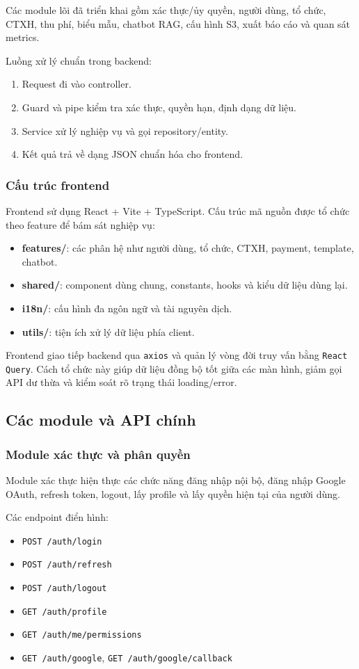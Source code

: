 Các module lõi đã triển khai gồm xác thực/ủy quyền, người dùng, tổ chức, CTXH, thu phí, biểu mẫu, chatbot RAG, cấu hình S3, xuất báo cáo và quan sát metrics.

Luồng xử lý chuẩn trong backend:
\begin{enumerate}
	\item Request đi vào controller.
	\item Guard và pipe kiểm tra xác thực, quyền hạn, định dạng dữ liệu.
	\item Service xử lý nghiệp vụ và gọi repository/entity.
	\item Kết quả trả về dạng JSON chuẩn hóa cho frontend.
\end{enumerate}

\subsubsection{Cấu trúc frontend}
Frontend sử dụng React + Vite + TypeScript. Cấu trúc mã nguồn được tổ chức theo feature để bám sát nghiệp vụ:
\begin{itemize}
	\item \textbf{features/}: các phân hệ như người dùng, tổ chức, CTXH, payment, template, chatbot.
	\item \textbf{shared/}: component dùng chung, constants, hooks và kiểu dữ liệu dùng lại.
	\item \textbf{i18n/}: cấu hình đa ngôn ngữ và tài nguyên dịch.
	\item \textbf{utils/}: tiện ích xử lý dữ liệu phía client.
\end{itemize}

Frontend giao tiếp backend qua \texttt{axios} và quản lý vòng đời truy vấn bằng \texttt{React Query}. Cách tổ chức này giúp dữ liệu đồng bộ tốt giữa các màn hình, giảm gọi API dư thừa và kiểm soát rõ trạng thái loading/error.

\subsection{Các module và API chính}

\subsubsection{Module xác thực và phân quyền}
Module xác thực hiện thực các chức năng đăng nhập nội bộ, đăng nhập Google OAuth, refresh token, logout, lấy profile và lấy quyền hiện tại của người dùng.

Các endpoint điển hình:
\begin{itemize}
	\item \texttt{POST /auth/login}
	\item \texttt{POST /auth/refresh}
	\item \texttt{POST /auth/logout}
	\item \texttt{GET /auth/profile}
	\item \texttt{GET /auth/me/permissions}
	\item \texttt{GET /auth/google}, \texttt{GET /auth/google/callback}
\end{itemize}

